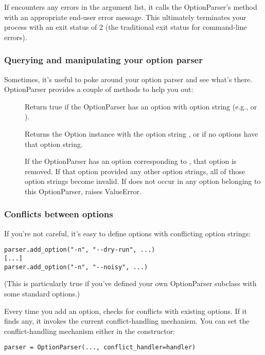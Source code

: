 If  encounters any errors in the argument list, it calls
the OptionParser's  method with an appropriate end-user error
message.  This ultimately terminates your process with an exit status of
2 (the traditional \UNIX{} exit status for command-line errors).


\subsubsection{Querying and manipulating your option parser\label{optparse-querying-manipulating-option-parser}}

Sometimes, it's useful to poke around your option parser and see what's
there.  OptionParser provides a couple of methods to help you out:
\begin{description}
\item[]
Return true if the OptionParser has an option with 
option string  (e.g.,  or ).
\item[]
Returns the Option instance with the option string , or
 if no options have that option string.
\item[]
If the OptionParser has an option corresponding to ,
that option is removed.  If that option provided any other
option strings, all of those option strings become invalid.
If  does not occur in any option belonging to this
OptionParser, raises ValueError.
\end{description}


\subsubsection{Conflicts between options\label{optparse-conflicts-between-options}}

If you're not careful, it's easy to define options with conflicting
option strings:
\begin{verbatim}
parser.add_option("-n", "--dry-run", ...)
[...]
parser.add_option("-n", "--noisy", ...)
\end{verbatim}

(This is particularly true if you've defined your own OptionParser
subclass with some standard options.)

Every time you add an option,  checks for conflicts with existing
options.  If it finds any, it invokes the current conflict-handling
mechanism.  You can set the conflict-handling mechanism either in the
constructor:
\begin{verbatim}
parser = OptionParser(..., conflict_handler=handler)
\end{verbatim}

